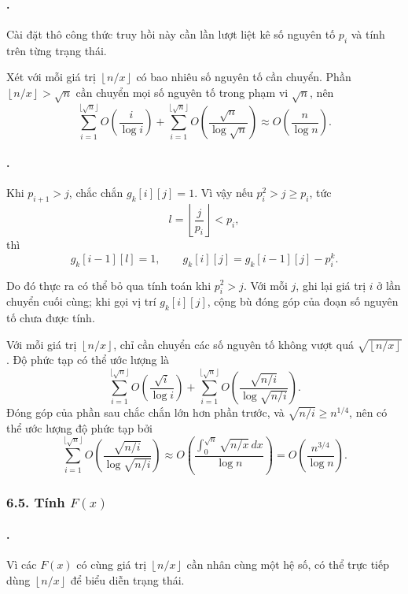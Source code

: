 \documentclass[11pt]{article}
\begin{document}
\paragraph{.}
Cài đặt thô công thức truy hồi này cần lần lượt liệt kê số nguyên tố \(p_i\)
và tính trên từng trạng thái.

Xét với mỗi giá trị \(\left\lfloor n/x\right\rfloor\) có bao nhiêu số nguyên
tố cần chuyển. Phần \(\left\lfloor n/x\right\rfloor>\sqrt n\) cần chuyển mọi
số nguyên tố trong phạm vi \(\sqrt n\), nên
\[
  \sum_{i=1}^{\lfloor\sqrt n\rfloor} O\left(\frac{i}{\log i}\right)
  +
  \sum_{i=1}^{\lfloor\sqrt n\rfloor}
  O\left(\frac{\sqrt n}{\log\sqrt n}\right)
  \approx
  O\left(\frac{n}{\log n}\right).
\]

\paragraph{.}
Khi \(p_{i+1}>j\), chắc chắn \(g_k[i][j]=1\). Vì vậy nếu
\(p_i^2>j\ge p_i\), tức
\[
  l=\left\lfloor\frac{j}{p_i}\right\rfloor<p_i,
\]
thì
\[
  g_k[i-1][l]=1,\qquad
  g_k[i][j]=g_k[i-1][j]-p_i^k.
\]

Do đó thực ra có thể bỏ qua tính toán khi \(p_i^2>j\). Với mỗi \(j\), ghi lại
giá trị \(i\) ở lần chuyển cuối cùng; khi gọi vị trí \(g_k[i][j]\), cộng bù
đóng góp của đoạn số nguyên tố chưa được tính.

Với mỗi giá trị \(\left\lfloor n/x\right\rfloor\), chỉ cần chuyển các số
nguyên tố không vượt quá \(\sqrt{\left\lfloor n/x\right\rfloor}\). Độ phức tạp
có thể ước lượng là
\[
  \sum_{i=1}^{\lfloor\sqrt n\rfloor} O\left(\frac{\sqrt i}{\log i}\right)
  +
  \sum_{i=1}^{\lfloor\sqrt n\rfloor}
  O\left(\frac{\sqrt{n/i}}{\log\sqrt{n/i}}\right).
\]
Đóng góp của phần sau chắc chắn lớn hơn phần trước, và \(\sqrt{n/i}\ge
n^{1/4}\), nên có thể ước lượng độ phức tạp bởi
\[
  \sum_{i=1}^{\lfloor\sqrt n\rfloor}
  O\left(\frac{\sqrt{n/i}}{\log\sqrt{n/i}}\right)
  \approx
  O\left(\frac{\int_0^{\sqrt n}\sqrt{n/x}\,dx}{\log n}\right)
  = O\left(\frac{n^{3/4}}{\log n}\right).
\]

\subsubsection*{6.5. Tính \(F(x)\)}

\paragraph{.}
Vì các \(F(x)\) có cùng giá trị \(\left\lfloor n/x\right\rfloor\) cần nhân
cùng một hệ số, có thể trực tiếp dùng \(\left\lfloor n/x\right\rfloor\) để
biểu diễn trạng thái.
\end{document}
